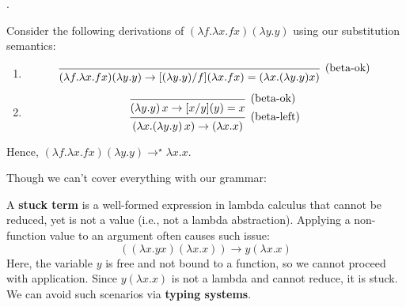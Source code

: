     .
\begin{Example}

    \noindent
    Consider the following derivations of $(\lambda f. \lambda x. fx)(\lambda y. y)$ using our substitution semantics:

    \begin{enumerate}
        \item \[
        \begin{prooftree}
        \Infer0[(beta-ok)]{(\lambda f. \lambda x. fx)(\lambda y. y) \rightarrow [(\lambda y. y)/f](\lambda x. fx)=(\lambda x. (\lambda y. y)x)}
        \end{prooftree}
        \]
        \item \[
        \begin{prooftree}
        
        \Infer0[(beta-ok)]{(\lambda y. y)\,x \rightarrow [x/y](y)=x}
        \Infer1[(beta-left)]{(\lambda x. (\lambda y. y)\,x) \rightarrow (\lambda x. x)}
        \end{prooftree}
        \]
    \end{enumerate}
    \noindent
    Hence, $(\lambda f. \lambda x. fx)(\lambda y. y)\rightarrow^{\star} \lambda x. x$.
\end{Example}

\newpage 

\noindent
Though we can't cover everything with our grammar:
\begin{Def}

    A \textbf{stuck term} is a well-formed expression in lambda calculus that cannot be reduced, yet is not a value (i.e., not a lambda abstraction). Applying a non-function value to an argument often causes such issue:
    \Large
    \[
    ((\lambda x. yx)(\lambda x. x)) \rightarrow y(\lambda x. x)
    \]
    \normalsize
    Here, the variable \(y\) is free and not bound to a function, so we cannot proceed with application. Since \(y(\lambda x. x)\) is not a lambda and cannot reduce, it is stuck.
    We can avoid such scenarios via \textbf{typing systems}.
    
\end{Def}


